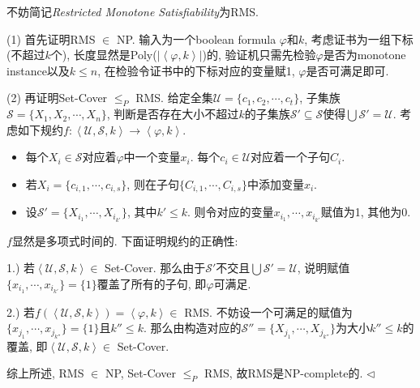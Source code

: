 \documentclass[11pt]{article}
\newenvironment{answer}[1][Answer]{\begin{trivlist}
\item[\hskip \labelsep{\bfseries\itshape#1.}\hskip \labelsep]}{\hfill$\lhd$\end{trivlist}}
\begin{document}
\begin{answer}
不妨简记\textit{Restricted Monotone Satisfiability}为RMS. 

(1) 首先证明RMS $\in$ NP. 输入为一个boolean formula $\varphi$和$k$, 考虑证书为一组下标(不超过$k$个), 长度显然是Poly($|\left\langle\varphi,k\right\rangle|$)的, 验证机只需先检验$\varphi$是否为monotone instance以及$k \le n$, 在检验令证书中的下标对应的变量赋1, $\varphi$是否可满足即可. 

(2) 再证明Set-Cover $\le_P$ RMS. 给定全集$\mathcal{U} = \{c_1, c_2, \cdots, c_t\}$, 子集族$\mathcal{S} = \{X_1, X_2, \cdots, X_n\}$, 判断是否存在大小不超过$k$的子集族$\mathcal{S}' \subseteq \mathcal{S}$使得$\bigcup \mathcal{S}' = \mathcal{U}$. 考虑如下规约$f:\left\langle \mathcal{U},\mathcal{S},k\right\rangle \rightarrow \left\langle \varphi,k \right\rangle$. 
\begin{itemize}
    \item 每个$X_i \in \mathcal{S}$对应着$\varphi$中一个变量$x_i$. 每个$c_i \in \mathcal{U}$对应着一个子句$C_i$. 
    \item 若$X_i = \{c_{i,1}, \cdots, c_{i,s}\}$, 则在子句$\{C_{i,1}, \cdots, C_{i,s}\}$中添加变量$x_i$.
    \item 设$\mathcal{S}' = \{X_{i_1}, \cdots, X_{i_{k'}}\}$, 其中$k' \le k$. 则令对应的变量$x_{i_1}, \cdots, x_{i_{k'}}$赋值为1, 其他为0.
\end{itemize}
$f$显然是多项式时间的. 下面证明规约的正确性:

1.) 若$\left\langle \mathcal{U},\mathcal{S},k\right\rangle \in$ Set-Cover. 那么由于$\mathcal{S}'$不交且$\bigcup \mathcal{S}' = \mathcal{U}$, 说明赋值$\{x_{i_1}, \cdots, x_{i_{k'}}\} = \{1\}$覆盖了所有的子句, 即$\varphi$可满足.

2.) 若$f(\left\langle \mathcal{U},\mathcal{S},k\right\rangle) = \left\langle \varphi,k\right\rangle \in$ RMS. 不妨设一个可满足的赋值为$\{x_{j_1}, \cdots, x_{j_{k''}}\} = \{1\}$且$k''\le k$. 那么由构造对应的$\mathcal{S}'' = \{ X_{j_1}, \cdots, X_{j_{k''}}\}$为大小$k'' \le k$的覆盖, 即$\left\langle \mathcal{U},\mathcal{S},k\right\rangle \in$ Set-Cover.

综上所述, RMS $\in$ NP, Set-Cover $\le_P$ RMS, 故RMS是NP-complete的.
\end{answer}
\end{document}
